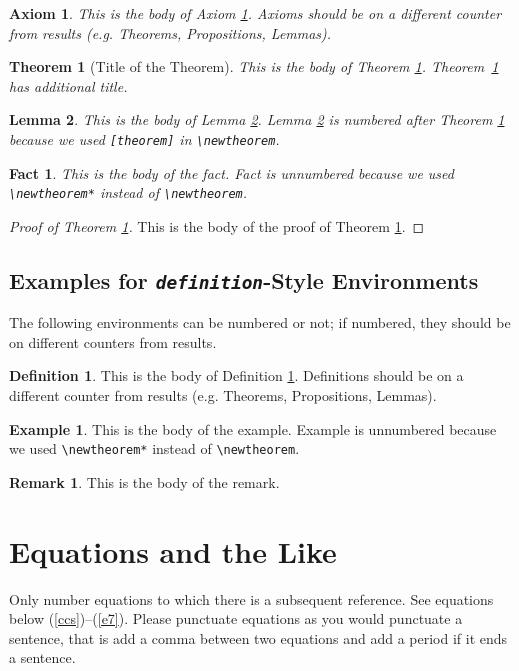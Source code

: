 \documentclass[ecta,nameyear,final,supplement]{econsocart}
\theoremstyle{plain}
\newtheorem{axiom}{Axiom}
\newtheorem{theorem}{Theorem}
\newtheorem{lemma}[theorem]{Lemma}
\newtheorem*{fact}{Fact}
\theoremstyle{definition}
\newtheorem{definition}{Definition}
\newtheorem*{example}{Example}
\newtheorem{remark}{Remark}
\begin{document}
\begin{axiom}\label{ax1}
This is the body of Axiom \ref{ax1}. Axioms should be on a different counter from results (e.g. Theorems, Propositions, Lemmas).
\end{axiom}

\begin{theorem}[Title of the Theorem]\label{th2}
This is the body of Theorem \ref{th2}. Theorem~\ref{th2} has additional title.
\end{theorem}

\begin{lemma}\label{le1}
This is the body of Lemma \ref{le1}. Lemma \ref{le1} is numbered after
Theorem \ref{th2} because we used \verb|[theorem]| in \verb|\newtheorem|.
\end{lemma}

\begin{fact}
This is the body of the fact. Fact is unnumbered because we used \verb|\newtheorem*|
instead of \verb|\newtheorem|.
\end{fact}

\begin{proof}[Proof of Theorem \ref{th2}]
This is the body of the proof of Theorem \ref{th2}.
\end{proof}


\subsection{Examples for \emph{\texttt{definition}}-Style Environments}


The following environments can be numbered or not; if numbered, they should be on different counters from results.

\begin{definition}\label{de1}
This is the body of Definition \ref{de1}. Definitions should be on a different counter from results (e.g. Theorems, Propositions, Lemmas).
\end{definition}

\begin{example}
This is the body of the example. Example is unnumbered because we used \verb|\newtheorem*|
instead of \verb|\newtheorem|.
\end{example}

\begin{remark}
This is the body of the remark. 
\end{remark}

\section{Equations and the Like}
Only number equations to which there is a subsequent reference.
See equations below (\ref{ccs})--(\ref{e7}). Please punctuate equations as you would punctuate a sentence, that is add a comma between two equations and add a period if it ends a sentence.
\end{document}

